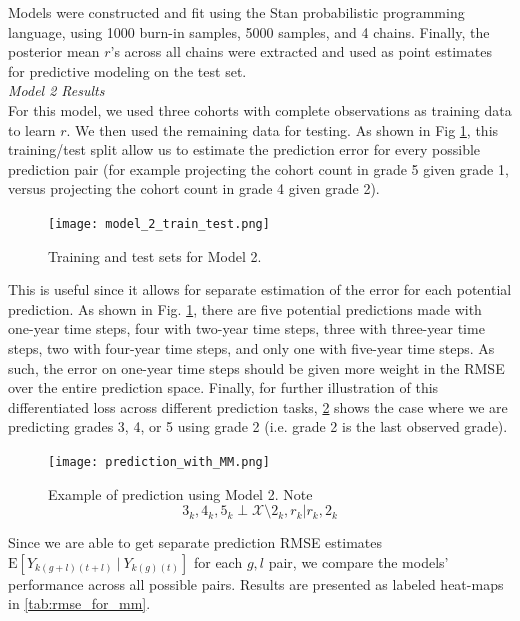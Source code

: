 \documentclass[journal]{IEEEtran}
\begin{document}
Models were constructed and fit using the Stan probabilistic programming language, using 1000 burn-in samples, 5000 samples, and 4 chains. Finally, the posterior mean $r$'s across all chains were extracted and used as point estimates for predictive modeling on the test set. \\

\noindent\emph{Model 2 Results} \\

For this model, we used three cohorts with complete observations as training data to learn \(r\). We then used the remaining data for testing. As shown in Fig \ref{fig:model_2_train_test}, this training/test split allow us to estimate the prediction error for every possible prediction pair (for example projecting the cohort count in grade 5 given grade 1, versus projecting the cohort count in grade 4 given grade 2). 

\begin{figure}[h!]
    \centering
    \texttt{[image: model\_2\_train\_test.png]}
    \caption{Training and test sets for Model 2.}
    \label{fig:model_2_train_test}
\end{figure}

This is useful since it allows for separate estimation of the error for each potential  prediction. As shown in Fig. \ref{fig:model_2_train_test}, there are five potential predictions made with one-year time steps, four with two-year time steps, three with three-year time steps, two with four-year time steps, and only one with five-year time steps. As such, the error on one-year time steps should be given more weight in the RMSE over the entire prediction space. Finally, for further illustration of this differentiated loss across different prediction tasks, \ref{fig:predict_with_mm} shows the case where we are predicting grades 3, 4, or 5 using grade 2 (i.e. grade 2 is the last observed grade).

\begin{figure}[h!]
    \centering
    \texttt{[image: prediction\_with\_MM.png]}
    \caption{Example of prediction using Model 2. Note \[{3_k, 4_k, 5_k} \perp \mathcal{X}\setminus{2_k,r_k} | {r_k, 2_k}\]}
    \label{fig:predict_with_mm}
\end{figure}

Since we are able to get separate prediction RMSE estimates \(\textrm{E}[Y_{k(g+l)(t+l)}~|~Y_{k(g)(t)}]\) for each \(g, l\) pair, we compare the models' performance across all possible pairs. Results are presented as labeled heat-maps in \ref{tab:rmse_for_mm}.
\end{document}
